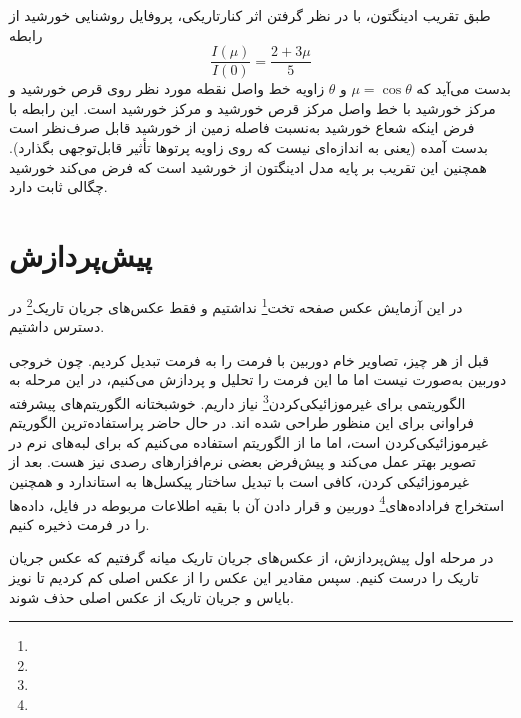 \documentclass[12pt,a4paper]{article}
\begin{document}
	طبق تقریب ادینگتون، با در نظر گرفتن اثر کنارتاریکی، پروفایل روشنایی خورشید از رابطه
	\begin{equation}
		\frac{I(\mu)}{I(0)} = \frac{2 + 3\mu}{5}
	\end{equation}
	بدست می‌آید که $\mu = \cos\theta$ و $\theta$ زاویه خط واصل نقطه مورد نظر روی قرص خورشید و مرکز خورشید با
	خط واصل مرکز قرص خورشید و مرکز خورشید است. این رابطه با فرض اینکه شعاع خورشید به‌نسبت فاصله زمین از خورشید
	قابل صرف‌نظر است بدست آمده (یعنی به اندازه‌ای نیست که روی زاویه پرتوها تأثیر قابل‌توجهی بگذارد). همچنین
	این تقریب بر پایه مدل ادینگتون از خورشید است که فرض می‌کند خورشید چگالی ثابت دارد.
	\section{پیش‌پردازش}
	در این آزمایش عکس صفحه تخت\footnote{} نداشتیم و فقط عکس‌های جریان تاریک\footnote{}
	در دسترس داشتیم.
	
	قبل از هر چیز، تصاویر خام دوربین با فرمت  را به فرمت  تبدیل کردیم. چون خروجی دوربین
	به‌صورت  نیست اما ما این فرمت را تحلیل و پردازش می‌کنیم، در این مرحله به الگوریتمی برای
	غیرموزائیکی‌کردن\footnote{} نیاز داریم. خوشبختانه الگوریتم‌های پیشرفته فراوانی برای این منظور
	طراحی شده اند. در حال حاضر  پراستفاده‌ترین الگوریتم غیرموزائیکی‌کردن است، اما ما از الگوریتم 
	استفاده می‌کنیم که برای لبه‌های نرم در تصویر بهتر عمل می‌کند و پیش‌فرض بعضی نرم‌افزارهای رصدی نیز هست. بعد از
	غیرموزائیکی کردن، کافی است با تبدیل ساختار پیکسل‌ها به استاندارد  و همچنین استخراج
	فراداده‌های\footnote{} دوربین و قرار دادن آن با بقیه اطلاعات مربوطه در  فایل، داده‌ها
	را در فرمت  ذخیره کنیم.
	
	در مرحله اول پیش‌پردازش، از عکس‌های جریان تاریک میانه گرفتیم که عکس  جریان تاریک را درست کنیم.
	سپس مقادیر این عکس را از عکس اصلی کم کردیم تا نویز بایاس و جریان تاریک از عکس اصلی حذف شوند.
	
\end{document}
